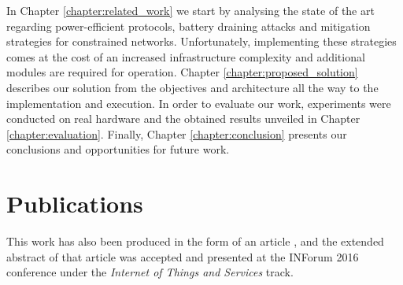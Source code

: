 In Chapter \ref{chapter:related_work} we start by analysing the state of the art regarding power-efficient protocols, battery draining attacks and mitigation strategies for constrained networks. Unfortunately, implementing these strategies comes at the cost of an increased infrastructure complexity and additional modules are required for operation. Chapter \ref{chapter:proposed_solution} describes our solution from the objectives and architecture all the way to the implementation and execution. In order to evaluate our work, experiments were conducted on real hardware and the obtained results unveiled in Chapter \ref{chapter:evaluation}. Finally, Chapter \ref{chapter:conclusion} presents our conclusions and opportunities for future work. 

\section{Publications} 
	
This work has also been produced in the form of an article \cite{Diogo2016}, and the extended abstract of that article was accepted and presented at the INForum 2016 conference under the \emph{Internet of Things and Services} track.
